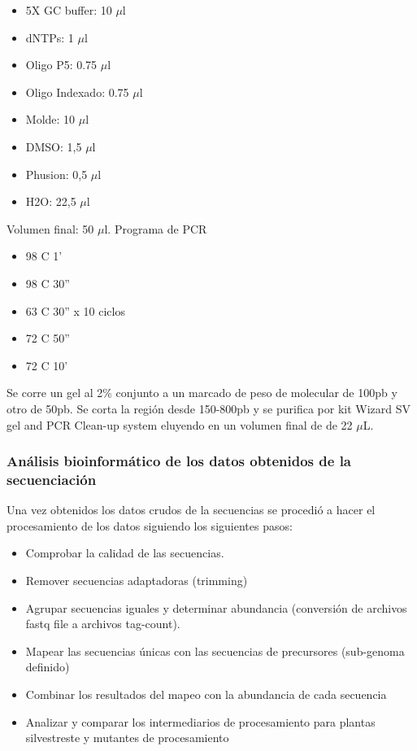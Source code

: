 \begin{itemize}
	\item 5X GC buffer: 10 $\mu$l
	\item dNTPs: 1 $\mu$l
	\item Oligo P5: 0.75 $\mu$l
	\item Oligo Indexado: 0.75 $\mu$l
	\item Molde: 10 $\mu$l 
	\item DMSO: 1,5 $\mu$l
	\item Phusion: 0,5 $\mu$l
	\item H2O: 22,5 $\mu$l
\end{itemize}
Volumen final: 50 $\mu$l.
Programa de PCR

\begin{itemize}
	\item 98 \degree C 1'
	\item 98 \degree C 30''
	\item 63 \degree C 30'' x 10 ciclos
	\item 72 \degree C 50''
	\item 72 \degree C 10'
\end{itemize}

Se corre un gel al 2\% conjunto a un marcado de peso de molecular de 100pb y otro de 50pb.
Se corta la región desde 150-800pb y se purifica por kit Wizard SV gel and PCR Clean-up system eluyendo en un volumen final de de 22 $\mu$L.

\subsubsection{Análisis bioinformático de los datos obtenidos de la secuenciación}\label{sec:analisis_spare}

Una vez obtenidos los datos crudos de la secuencias se procedió a hacer el procesamiento de los datos siguiendo los siguientes pasos:
\begin{itemize}
	\item Comprobar la calidad de las secuencias.
	\item Remover secuencias adaptadoras (trimming)
	\item Agrupar secuencias iguales y determinar abundancia (conversión de archivos fastq file a archivos tag-count).
	\item Mapear las secuencias únicas con las secuencias de precursores (sub-genoma definido)
	\item Combinar los resultados del mapeo con la abundancia de cada secuencia
	\item Analizar y comparar los intermediarios de procesamiento para plantas silvestreste y mutantes de procesamiento
\end{itemize}

